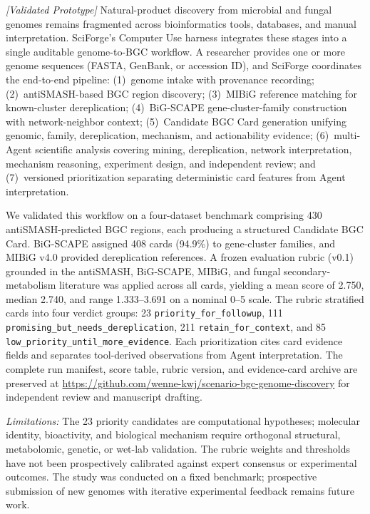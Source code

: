 \documentclass[sn-basic,Numbered,pdflatex]{sn-jnl}
\begin{document}
\textit{[Validated Prototype]} Natural-product discovery from microbial and fungal genomes remains fragmented across bioinformatics tools, databases, and manual interpretation. SciForge's Computer Use harness integrates these stages into a single auditable genome-to-BGC workflow. A researcher provides one or more genome sequences (FASTA, GenBank, or accession ID), and SciForge coordinates the end-to-end pipeline: (1)~genome intake with provenance recording; (2)~antiSMASH-based BGC region discovery; (3)~MIBiG reference matching for known-cluster dereplication; (4)~BiG-SCAPE gene-cluster-family construction with network-neighbor context; (5)~Candidate BGC Card generation unifying genomic, family, dereplication, mechanism, and actionability evidence; (6)~multi-Agent scientific analysis covering mining, dereplication, network interpretation, mechanism reasoning, experiment design, and independent review; and (7)~versioned prioritization separating deterministic card features from Agent interpretation.

We validated this workflow on a four-dataset benchmark comprising 430 antiSMASH-predicted BGC regions, each producing a structured Candidate BGC Card. BiG-SCAPE assigned 408 cards (94.9\%) to gene-cluster families, and MIBiG v4.0 provided dereplication references. A frozen evaluation rubric (v0.1) grounded in the antiSMASH, BiG-SCAPE, MIBiG, and fungal secondary-metabolism literature was applied across all cards, yielding a mean score of 2.750, median 2.740, and range 1.333--3.691 on a nominal 0--5 scale. The rubric stratified cards into four verdict groups: 23 \texttt{priority\_for\_followup}, 111 \texttt{promising\_but\_needs\_dereplication}, 211 \texttt{retain\_for\_context}, and 85 \texttt{low\_priority\_until\_more\_evidence}. Each prioritization cites card evidence fields and separates tool-derived observations from Agent interpretation. The complete run manifest, score table, rubric version, and evidence-card archive are preserved at \url{https://github.com/wenne-kwj/scenario-bgc-genome-discovery} for independent review and manuscript drafting.

\textit{Limitations:} The 23 priority candidates are computational hypotheses; molecular identity, bioactivity, and biological mechanism require orthogonal structural, metabolomic, genetic, or wet-lab validation. The rubric weights and thresholds have not been prospectively calibrated against expert consensus or experimental outcomes. The study was conducted on a fixed benchmark; prospective submission of new genomes with iterative experimental feedback remains future work.
\end{document}
